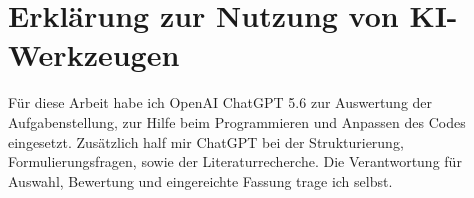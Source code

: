\section*{Erklärung zur Nutzung von KI-Werkzeugen}

Für diese Arbeit habe ich OpenAI ChatGPT 5.6 zur Auswertung der Aufgabenstellung, zur Hilfe beim Programmieren und
Anpassen des Codes eingesetzt. Zusätzlich half mir ChatGPT bei der Strukturierung, Formulierungsfragen, sowie der Literaturrecherche. Die Verantwortung für
Auswahl, Bewertung und eingereichte Fassung trage ich selbst.